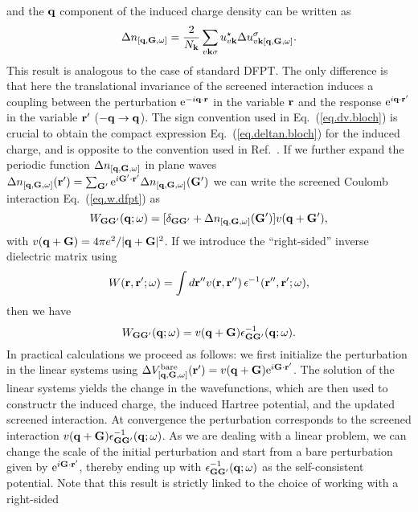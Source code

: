 \documentclass[twocolumn,prb,showpacs,superscriptaddress]{revtex4}
\def\w{\omega}
\def\q{{\bf q}}
\def\s{\sigma}
\def\k{{\bf k}}
\def\G{{\bf G}}
\def\Gp{{\bf G^\prime}}
\def\r{{\bf r}}
\def\rp{{\bf r^\prime}}
\def\rpp{{\bf r^{\prime\prime}}}
\begin{document}
and the $\q$ component of the induced charge density can be written as
  \begin{equation} \label{eq.deltan.bloch}
  \Delta n_{[\q,\G,\w]} = \frac{2}{N_\k}\sum_{v\k\s} u_{v\k}^\star  \Delta u^\s_{v\k[\q,\G,\w]}.
  \end{equation}
This result is analogous to the case of standard DFPT. The only difference is that
here the translational invariance of the screened interaction induces a coupling
between the perturbation ${\rm e}^{-i\q\cdot\r}$ in the variable $\r$ and the response
${\rm e}^{i\q\cdot\rp}$ in the variable $\rp$ ($-\q \rightarrow \q$).
The sign convention used in Eq.\ (\ref{eq.dv.bloch}) is crucial to obtain
the compact expression Eq.\ (\ref{eq.deltan.bloch}) for the induced charge,
and is opposite to the convention used in Ref.\ .
If we further expand the periodic function $\Delta n_{[\q,\G,\w]}$ in plane
waves $\Delta n_{[\q,\G,\w]}(\rp)=\sum_\Gp {\rm e}^{i\Gp\cdot\rp} \Delta n_{[\q,\G,\w]}(\Gp)$
we can write the screened Coulomb interaction Eq.\ (\ref{eq.w.dfpt}) as
  \begin{equation}
  W_{\G\Gp}(\q;\w) = [\delta_{\G\Gp} + \Delta n_{[\q,\G,\w]}(\Gp) ]v(\q+\Gp),
  \end{equation}
with $v(\q+\G) = 4\pi e^2/|\q+\G|^2$.
If we introduce the ``right-sided'' inverse dielectric matrix using
  \begin{equation}
  W(\r,\rp;\w) = \int d\rpp v(\r,\rpp) \, \epsilon^{-1}(\rpp,\rp;\w),
  \end{equation}
then we have
  \begin{equation}\label{eq.Wg}
  W_{\G\Gp}(\q;\w) = v(\q+\G)  \epsilon^{-1}_{\G\Gp}(\q;\w).
  \end{equation}
In practical calculations we proceed as follows: we first initialize the perturbation
in the linear systems using $\Delta V^{\rm bare}_{[\q,\G,\w]}(\rp) = v(\q+\G) {\rm e}^{i\G\cdot\rp}$.
The solution of the linear systems yields the change in the wavefunctions,
which are then used to constructr the induced charge, the induced Hartree potential,
and the updated screened interaction. At convergence the perturbation corresponds to
the screened interaction $v(\q+\G) \epsilon^{-1}_{\G\Gp}(\q;\w)$.
%
As we are dealing with a linear problem, we can change the scale of the initial
perturbation and start from a bare perturbation given by ${\rm e}^{i\G\cdot\rp}$,
thereby ending up with $\epsilon^{-1}_{\G\Gp}(\q;\w)$ as the self-consistent potential.
Note that this result is strictly linked to the choice of working with a right-sided 
\end{document}
